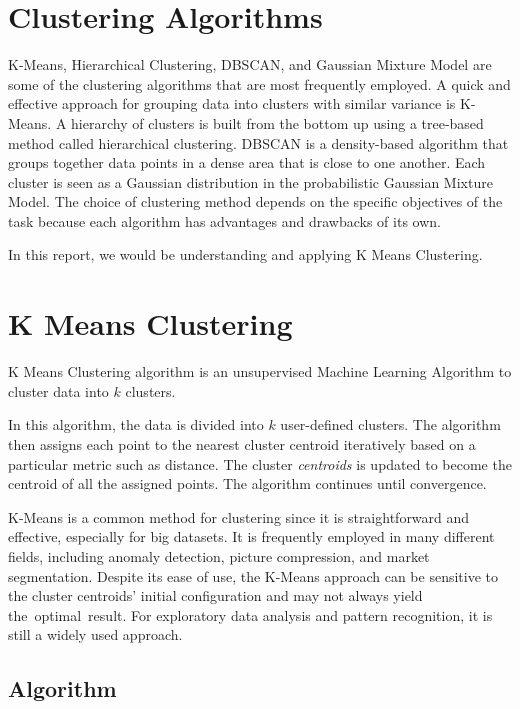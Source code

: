 \documentclass[conference]{IEEEtran}
\begin{document}
\section{Clustering Algorithms}
K-Means, Hierarchical Clustering, DBSCAN, and Gaussian Mixture Model are some of the clustering algorithms that are most frequently employed. A quick and effective approach for grouping data into clusters with similar variance is K-Means. A hierarchy of clusters is built from the bottom up using a tree-based method called hierarchical clustering. DBSCAN is a density-based algorithm that groups together data points in a dense area that is close to one another. Each cluster is seen as a Gaussian distribution in the probabilistic Gaussian Mixture Model. The choice of clustering method depends on the specific objectives of the task because each algorithm has advantages and drawbacks of its own.

In this report, we would be understanding and applying K Means Clustering.
\section{K Means Clustering}
K Means Clustering algorithm is an unsupervised Machine Learning Algorithm to cluster data into $k$ clusters.

In this algorithm, the data is divided into $k$ user-defined clusters. The algorithm then assigns each point to the nearest cluster centroid iteratively based on a particular metric such as distance. The cluster \textit{centroids} is updated to become the centroid of all the assigned points. The algorithm continues until convergence.

K-Means is a common method for clustering since it is straightforward and effective, especially for big datasets. It is frequently employed in many different fields, including anomaly detection, picture compression, and market segmentation. Despite its ease of use, the K-Means approach can be sensitive to the cluster centroids' initial configuration and may not always yield the optimal result. For exploratory data analysis and pattern recognition, it is still a widely used approach.
\subsection{Algorithm}

\end{document}
